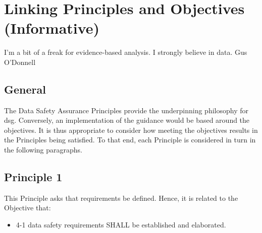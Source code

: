 %
%
\section{Linking Principles and Objectives (Informative)} \label{bkm:principlesobjectives}

\dsiwgSectionQuote
  {I'm a bit of a freak for evidence-based analysis. I strongly believe in data.}
  {Gus O'Donnell}


\subsection{General}

The Data Safety Assurance Principles provide the underpinning philosophy for \gls{dsg}. Conversely, an implementation of the guidance would be based around the objectives. It is thus appropriate to consider how meeting the objectives results in the Principles being satisfied. To that end, each Principle is considered in turn in the following paragraphs.


\subsection{Principle 1}

This Principle asks that requirements be defined. Hence, it is related to the Objective that:

\begin{itemize}
	\item \textcolor{dsiwgAccentColour}{4-1} \Glspl{data safety requirement} SHALL be established and elaborated.
\end{itemize}

